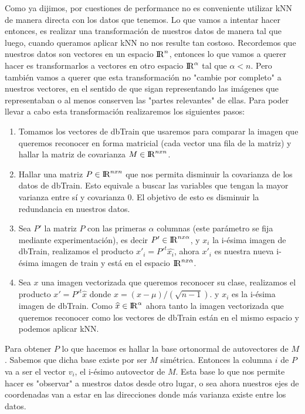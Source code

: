 \par Como ya dijimos, por cuestiones de performance no es conveniente utilizar kNN de manera directa con los datos que tenemos. Lo que vamos a intentar hacer entonces, es realizar una transformación de nuestros datos de manera tal que luego, cuando queramos aplicar kNN no nos resulte tan costoso. Recordemos que nuestros datos son vectores en un espacio ${\rm I\!R}^n$, entonces lo que vamos a querer hacer es transformarlos a vectores en otro espacio ${\rm I\!R}^\alpha$ tal que $\alpha < n$. Pero también vamos a querer que esta transformación no "cambie por completo" a nuestros vectores, en el sentido de que sigan representando las imágenes que representaban o al menos conserven las "partes relevantes" de ellas. Para poder llevar a cabo esta transformación realizaremos los siguientes pasos:

\begin{enumerate}
\item Tomamos los vectores de dbTrain que usaremos para comparar la imagen que queremos reconocer en forma matricial (cada vector una fila de la matriz) y hallar la matriz de covarianza $M \in {\rm I\!R}^{nxn}$.
\item Hallar una matriz $P \in {\rm I\!R}^{nxn}$ que nos permita disminuir la covarianza de los datos de dbTrain. Esto equivale a buscar las variables que tengan la mayor varianza entre sí y covarianza 0. El objetivo de esto es disminuir la redundancia en nuestros datos.
\item Sea $P'$ la matriz $P$ con las primeras $\alpha$ columnas (este parámetro se fija mediante experimentación), es decir $P' \in {\rm I\!R}^{nx\alpha}$, y $x_i$ la i-ésima imagen de dbTrain, realizamos el producto $x'_i = P'^t \widehat{x_i}$, ahora $x'_i$ es nuestra nueva i-ésima imagen de train y está en el espacio ${\rm I\!R}^{nx\alpha}$.
\item Sea $x$ una imagen vectorizada que queremos reconocer su clase, realizamos el producto $x'= P'^t\widehat{x}$ donde $\widehat{x} = (x - \mu) / (\sqrt{n - 1})$. y $x_i$ es la i-ésima imagen de dbTrain. Como $\widehat{x} \in {\rm I\!R}^{\alpha}$ ahora tanto la imagen vectorizada que queremos reconocer como los vectores de dbTrain están en el mismo espacio y podemos aplicar kNN.
\end{enumerate}

Para obtener $P$ lo que hacemos es hallar la base ortonormal de autovectores de $M$. Sabemos que dicha base existe por ser $M$ simétrica. Entonces la columna $i$ de $P$ va a ser el vector $v_i$, el i-ésimo autovector de $M$. Esta base lo que nos permite hacer es "observar" a nuestros datos desde otro lugar, o sea ahora nuestros ejes de coordenadas van a estar en las direcciones donde más varianza existe entre los datos.

